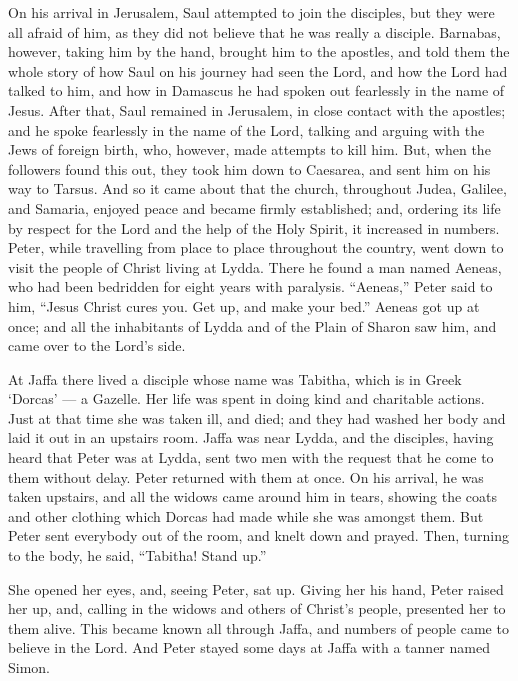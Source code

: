  On his arrival in Jerusalem, Saul attempted to join the
disciples, but they were all afraid of him, as they did not believe that
he was really a disciple.  Barnabas, however, taking him by
the hand, brought him to the apostles, and told them the whole story of
how Saul on his journey had seen the Lord, and how the Lord had talked
to him, and how in Damascus he had spoken out fearlessly in the name of
Jesus.  After that, Saul remained in Jerusalem, in close
contact with the apostles; and he spoke fearlessly in the name of the
Lord,  talking and arguing with the Jews of foreign birth,
who, however, made attempts to kill him.  But, when the
followers found this out, they took him down to Caesarea, and sent him
on his way to Tarsus.  And so it came about that the
church, throughout Judea, Galilee, and Samaria, enjoyed peace and became
firmly established; and, ordering its life by respect for the Lord and
the help of the Holy Spirit, it increased in numbers. 
Peter, while travelling from place to place throughout the country, went
down to visit the people of Christ living at Lydda.  There
he found a man named Aeneas, who had been bedridden for eight years with
paralysis.  ``Aeneas,'' Peter said to him, ``Jesus Christ
cures you. Get up, and make your bed.'' Aeneas got up at once;
 and all the inhabitants of Lydda and of the Plain of
Sharon saw him, and came over to the Lord's side.

 At Jaffa there lived a disciple whose name was Tabitha,
which is in Greek `Dorcas' --- a Gazelle. Her life was spent in doing
kind and charitable actions.  Just at that time she was
taken ill, and died; and they had washed her body and laid it out in an
upstairs room.  Jaffa was near Lydda, and the disciples,
having heard that Peter was at Lydda, sent two men with the request that
he come to them without delay.  Peter returned with them at
once. On his arrival, he was taken upstairs, and all the widows came
around him in tears, showing the coats and other clothing which Dorcas
had made while she was amongst them.  But Peter sent
everybody out of the room, and knelt down and prayed. Then, turning to
the body, he said, ``Tabitha! Stand up.''

She opened her eyes, and, seeing Peter, sat up.  Giving her
his hand, Peter raised her up, and, calling in the widows and others of
Christ's people, presented her to them alive.  This became
known all through Jaffa, and numbers of people came to believe in the
Lord.  And Peter stayed some days at Jaffa with a tanner
named Simon.

